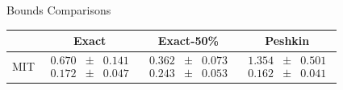 \documentclass[10pt]{beamer}
\begin{document}
\begin{frame}{Bounds Comparisons}
\begin{table}[t]
  \begin{center}
      \begin{tabular}[c]{cccc}
        \toprule
        & Exact & Exact-50\% & Peshkin \\
        \midrule
        MIT & $\begin{matrix}0.670\\0.172\end{matrix} \begin{matrix}\pm\\\pm\end{matrix} \begin{matrix}0.141\\ 0.047\end{matrix}$ & $\begin{matrix}\mathbf{0.362}\\\mathbf{0.243}\end{matrix} \begin{matrix}\pm\\\pm\end{matrix} \begin{matrix}0.073\\ 0.053\end{matrix}$ & $\begin{matrix}1.354\\0.162\end{matrix} \begin{matrix}\pm\\\pm\end{matrix} \begin{matrix}0.501\\ 0.041\end{matrix}$ \\
        \midrule

\end{tabular}
\end{center}
\end{table}
\end{frame}
\end{document}
